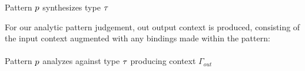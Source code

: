   \judgbox{\ensuremath{\ctxSynPat{\Gamma}{\PMV}{\TMV}}} Pattern $\PMV$ synthesizes type $\TMV$
  \begin{mathpar}
   
   

  \end{mathpar}
  \label{fig:calculus-pattern-synthesis}

For our analytic pattern judgement, out output context is produced, consisting of the input context augmented with any bindings made within the pattern: \\
\\
 Pattern $\PMV$ analyzes against type $\TMV$ producing context $\Gamma_{out}$
  \begin{mathpar}
   
   

  \end{mathpar}

